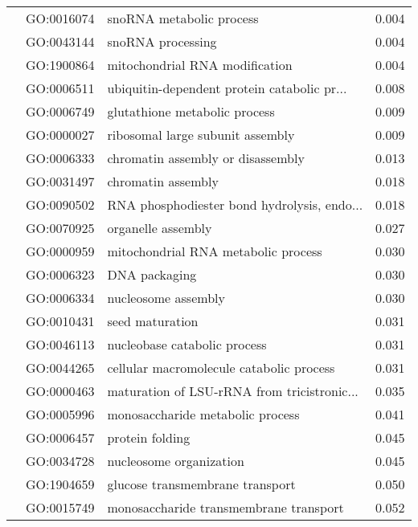 \begin{longtable}{lllr}
   & GO:0016074 &                     snoRNA metabolic process &         0.004 \\
   & GO:0043144 &                            snoRNA processing &         0.004 \\
   & GO:1900864 &               mitochondrial RNA modification &         0.004 \\
   & GO:0006511 &  ubiquitin-dependent protein catabolic pr... &         0.008 \\
   & GO:0006749 &                glutathione metabolic process &         0.009 \\
   & GO:0000027 &             ribosomal large subunit assembly &         0.009 \\
   & GO:0006333 &            chromatin assembly or disassembly &         0.013 \\
   & GO:0031497 &                           chromatin assembly &         0.018 \\
   & GO:0090502 &  RNA phosphodiester bond hydrolysis, endo... &         0.018 \\
   & GO:0070925 &                           organelle assembly &         0.027 \\
   & GO:0000959 &          mitochondrial RNA metabolic process &         0.030 \\
   & GO:0006323 &                                DNA packaging &         0.030 \\
   & GO:0006334 &                          nucleosome assembly &         0.030 \\
   & GO:0010431 &                              seed maturation &         0.031 \\
   & GO:0046113 &                 nucleobase catabolic process &         0.031 \\
   & GO:0044265 &     cellular macromolecule catabolic process &         0.031 \\
   & GO:0000463 &  maturation of LSU-rRNA from tricistronic... &         0.035 \\
   & GO:0005996 &             monosaccharide metabolic process &         0.041 \\
   & GO:0006457 &                              protein folding &         0.045 \\
   & GO:0034728 &                      nucleosome organization &         0.045 \\
   & GO:1904659 &              glucose transmembrane transport &         0.050 \\
   & GO:0015749 &       monosaccharide transmembrane transport &         0.052 \\

\end{longtable}
